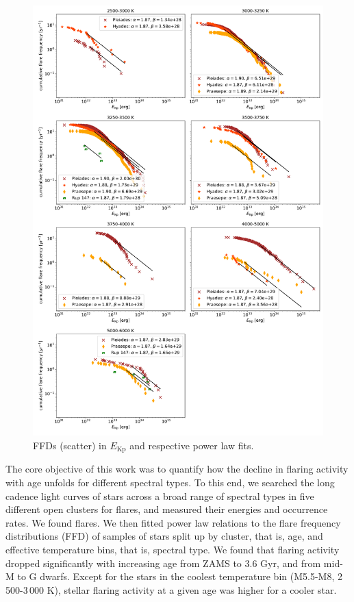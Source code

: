 \documentclass{aa}
\begin{document}
\begin{figure}
    \centering
    \includegraphics[width=16cm]{pics/FFDs/SpT_wise_sample_ffd_energy_wheatland.png}
    \caption{FFDs (scatter) in $E_\mathrm{Kp}$ and respective power law fits.}          	
    \label{fig:powerlawfits_erg}
\end{figure}
The core objective of this work was to quantify how the decline in flaring activity with age unfolds for different spectral types. To this end, we searched the long cadence light curves of stars across a broad range of spectral types in five different open clusters for flares, and measured their energies and occurrence rates. We found  flares. We then fitted power law relations to the flare frequency distributions (FFD) of samples of stars split up by cluster, that is, age, and effective temperature bins, that is, spectral type. We found that flaring activity dropped significantly with increasing age from ZAMS to 3.6 Gyr, and from mid-M to G dwarfs. Except for the stars in the coolest temperature bin (M5.5-M8, 2\,500-3\,000 K), stellar flaring activity at a given age was higher for a cooler star.
\end{document}
